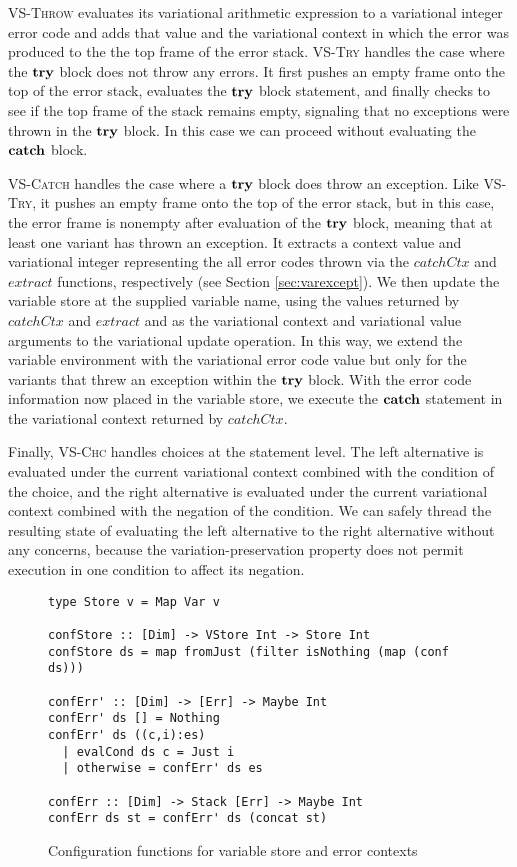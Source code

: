 \documentclass[12pt,oneside]{book}
\begin{document}
\textsc{VS-Throw} evaluates its variational arithmetic expression to a variational integer error code and adds that value and the variational context
in which the error was produced to the the top frame of the error stack. \textsc{VS-Try} handles the case where the $\textbf{\textup{\textrm{try}}}$ block does not throw
any errors. It first pushes an empty frame onto the top of the error stack, evaluates the $\textbf{\textup{\textrm{try}}}$ block statement, and finally checks to see if
the top frame of the stack remains empty, signaling that no exceptions were thrown in the $\textbf{\textup{\textrm{try}}}$ block. In this case we can proceed without evaluating the $\textbf{\textup{\textrm{catch}}}$ block.

\textsc{VS-Catch} handles the case where a $\textbf{\textup{\textrm{try}}}$ block does throw an exception. Like \textsc{VS-Try}, it pushes an empty frame onto the top of the error
stack, but in this case, the error frame is nonempty after evaluation of the $\textbf{\textup{\textrm{try}}}$ block, meaning that at least one variant has thrown an exception.
It extracts a context value and variational integer representing the all error codes thrown via the $\mathit{catchCtx}$ and $\mathit{extract}$ functions, respectively (see
Section \ref{sec:varexcept}). We then update the variable store at the supplied variable name, using the values returned by $\mathit{catchCtx}$ and $\mathit{extract}$
and as the variational context and variational value arguments to the variational update operation. In this way, we extend the variable environment with the variational
error code value but only for the variants that threw an exception within the $\textbf{\textup{\textrm{try}}}$ block. With the error code information now placed in the variable store,
we execute the $\textbf{\textup{\textrm{catch}}}$ statement in the variational context returned by $\mathit{catchCtx}$.

Finally, \textsc{VS-Chc} handles choices at the statement level. The left alternative is evaluated under the current variational context combined with the condition of
the choice, and the right alternative is evaluated under the current variational context combined with the negation of the condition.
We can safely thread the resulting state of evaluating the left alternative to the right alternative without any concerns, because the variation-preservation property
does not permit execution in one condition to affect its negation.

\begin{figure}
\begin{lstlisting}
type Store v = Map Var v

confStore :: [Dim] -> VStore Int -> Store Int
confStore ds = map fromJust (filter isNothing (map (conf ds)))

confErr' :: [Dim] -> [Err] -> Maybe Int
confErr' ds [] = Nothing
confErr' ds ((c,i):es)
  | evalCond ds c = Just i
  | otherwise = confErr' ds es

confErr :: [Dim] -> Stack [Err] -> Maybe Int
confErr ds st = confErr' ds (concat st)
\end{lstlisting}
\caption{Configuration functions for variable store and error contexts}
\label{fig:confstmt}
\end{figure}
\end{document}
